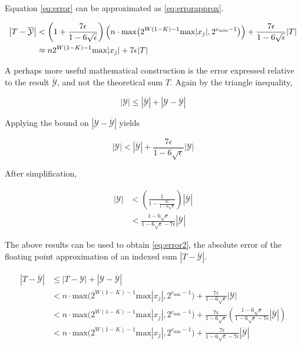 \documentclass[12pt]{article}
\providecommand{\min}{\ensuremath{\text{min}}}
\providecommand{\max}{\ensuremath{\text{max}}}
\theoremstyle{definition}
\numberwithin{equation}{section}
\numberwithin{figure}{section}
\begin{document}
    Equation \eqref{eq:error} can be approximated as \eqref{eq:errorapprox}.

    \begin{align}
      \left|T - \overline{\mathcal{Y}}\right| &< \left(1 + \frac{7\epsilon}{1 - 6\sqrt\epsilon}\right) \Bigl(n \cdot \max\bigl(2^{W (1 - K) - 1} \max|x_j|, 2^{e_{\min} - 1}\bigr)\Bigr) + \frac{7\epsilon}{1 - 6\sqrt\epsilon} |T| \nonumber \\
    &\approx n 2^{W  (1 - K) - 1} \max|x_j| + 7  \epsilon |T|
      \label{eq:errorapprox}
    \end{align}

    A perhaps more useful mathematical construction is the error expressed relative to the result $\overline{\mathcal{Y}}$, and not the theoretical sum $T$. Again by the triangle inequality,

    \begin{equation*}
      |\mathcal{Y}| \leq \left|\overline{\mathcal{Y}}\right| + \left|\mathcal{Y} - \overline{\mathcal{Y}}\right|
    \end{equation*}

    Applying the bound on $|\mathcal{Y} - \overline{\mathcal{Y}}|$ yields

    \begin{equation*}
      |\mathcal{Y}| < \left|\overline{\mathcal{Y}}\right| + \frac{7\epsilon}{1 - 6\sqrt\epsilon}|\mathcal{Y}|
    \end{equation*}

    After simplification,

    \begin{align*}
      |\mathcal{Y}| &< \left(\frac{1}{1 - \frac{7\epsilon}{1 - 6\sqrt\epsilon}}\right)  \left|\overline{\mathcal{Y}}\right| \nonumber \\
      &< \frac{1 - 6 \sqrt\epsilon}{1 - 6 \sqrt \epsilon - 7\epsilon}  \left|\overline{\mathcal{Y}}\right|
    \end{align*}

    The above results can be used to obtain  \eqref{eq:error2}, the absolute error of the floating point approximation of an indexed sum $|T - \overline{\mathcal{Y}}|$.

    \begin{align}
      \left|T - \overline{\mathcal{Y}}\right| &\leq |T - \mathcal{Y}| + \left|\mathcal{Y} - \overline{\mathcal{Y}}\right| \nonumber \\
      &< n \cdot \max\bigl(2^{W  (1 - K) - 1}  \max|x_j|, 2^{e_{\min} - 1}\bigr) + \frac{7\epsilon}{1 - 6\sqrt\epsilon}|\mathcal{Y}| \nonumber \\
      &< n \cdot \max\bigl(2^{W  (1 - K) - 1}  \max|x_j|, 2^{e_{\min} - 1}\bigr) + \frac{7\epsilon}{1 - 6\sqrt\epsilon}\left(\frac{1 - 6 \sqrt\epsilon}{1 - 6 \sqrt \epsilon - 7\epsilon}\left|\overline{\mathcal{Y}}\right|\right) \nonumber \\
      &< n \cdot \max\bigl(2^{W  (1 - K) - 1}  \max|x_j|, 2^{e_{\min} - 1}\bigr) + \frac{7\epsilon}{1 - 6 \sqrt \epsilon - 7\epsilon}\left|\overline{\mathcal{Y}}\right|
      \label{eq:error2}
    \end{align}
\end{document}
